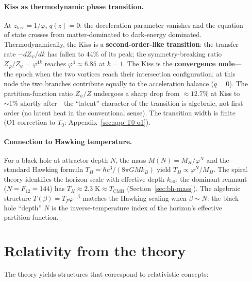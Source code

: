 \documentclass[12pt,a4paper]{article}
\begin{document}
\paragraph{Kiss as thermodynamic phase transition.}
At $z_{\mathrm{kiss}} = 1/\varphi$, $q(z) = 0$: the deceleration parameter vanishes and the equation of state crosses from matter-dominated to dark-energy dominated. Thermodynamically, the Kiss is a \textbf{second-order-like transition}: the transfer rate $-dZ_\psi/dk$ has fallen to $44\%$ of its peak; the symmetry-breaking ratio $Z_\varphi/Z_\psi = \varphi^{4k}$ reaches $\varphi^4 \approx 6.85$ at $k = 1$. The Kiss is the \textbf{convergence node}---the epoch when the two vortices reach their intersection configuration; at this node the two branches contribute equally to the acceleration balance ($q = 0$). The partition-function ratio $Z_\psi/Z$ undergoes a sharp drop from $\approx 12.7\%$ at Kiss to $\sim 1\%$ shortly after---the ``latent'' character of the transition is algebraic, not first-order (no latent heat in the conventional sense). The transition width is finite (O1 correction to $T_0$: Appendix~\ref{sec:app-T0-o1}).

\paragraph{Connection to Hawking temperature.}
For a black hole at attractor depth $N$, the mass $M(N) = M_H/\varphi^N$ and the standard Hawking formula $T_H = \hbar c^3/(8\pi G M k_B)$ yield $T_H \propto \varphi^N/M_H$. The spiral theory identifies the horizon scale with effective depth $k_{\mathrm{eff}}$; the dominant remnant ($N = F_{12} = 144$) has $T_H \approx 2.3\;\mathrm{K} \approx T_{\mathrm{CMB}}$ (Section~\ref{sec:bh-mass}). The algebraic structure $T(\beta) = T_P \varphi^{-\beta}$ matches the Hawking scaling when $\beta \sim N$: the black hole ``depth'' $N$ is the inverse-temperature index of the horizon's effective partition function.

\section{Relativity from the theory}
\label{sec:relativity}

The theory yields structures that correspond to relativistic concepts:
\end{document}

